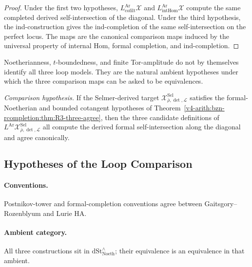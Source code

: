 \begin{proof}
Under the first two hypotheses,
\(L^{\mathrm{Ar}}_{\mathrm{cofilt}}\mathcal X\) and
\(L^{\mathrm{Ar}}_{\mathrm{intHom}}\mathcal X\) compute the same
completed derived self-intersection of the diagonal. Under the third
hypothesis, the ind-construction gives the ind-completion of the same
self-intersection on the perfect locus. The maps are the canonical
comparison maps induced by the universal property of internal Hom,
formal completion, and ind-completion.
\end{proof}

\begin{remark}
\label{v4-arith:bzn-rcompletion:rem:hyp-failures}
Noetherianness, \(t\)-boundedness, and finite Tor-amplitude do not by
themselves identify all three loop models. They are the natural
ambient hypotheses under which the three comparison maps can be
asked to be equivalences.
\end{remark}

\begin{corollary}
\label{v4-arith:bzn-rcompletion:cor:R3-for-EG}
\emph{Comparison hypothesis.} If the Selmer-derived target
\(\mathcal{X}^{\mathrm{Sel}}_{\bar\rho,\det,\mathcal{L}}\) satisfies
the formal-Noetherian and bounded cotangent hypotheses of
Theorem~\ref{v4-arith:bzn-rcompletion:thm:R3-three-agree}, then the three
candidate definitions of
\(L^{\mathrm{Ar}}\mathcal{X}^{\mathrm{Sel}}_{\bar\rho,\det,\mathcal{L}}\)
all compute the derived formal self-intersection along the diagonal
and agree canonically.
\end{corollary}

\subsection{Hypotheses of the Loop Comparison}

\paragraph{Conventions.} Postnikov-tower and formal-completion
conventions agree between Gaitsgory--Rozenblyum and Lurie HA.

\paragraph{Ambient category.} All three constructions sit in
\(\mathrm{dSt}^{\wedge}_{\mathrm{Noeth}}\); their equivalence is
an equivalence in that ambient.


